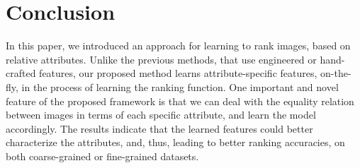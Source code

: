 

\section{Conclusion}
\label{sec.5}

In this paper, we introduced an approach for learning to rank images, based on relative attributes. Unlike the previous methods, that use engineered or hand-crafted features, our proposed method learns attribute-specific features, on-the-fly, in the process of learning the ranking function. One important and novel feature of the proposed framework is that we can deal with the equality relation between images in terms of each specific attribute, and learn the model accordingly. The results indicate that the learned features could better characterize the attributes, and, thus, leading to better ranking accuracies, on both coarse-grained or fine-grained datasets. 



